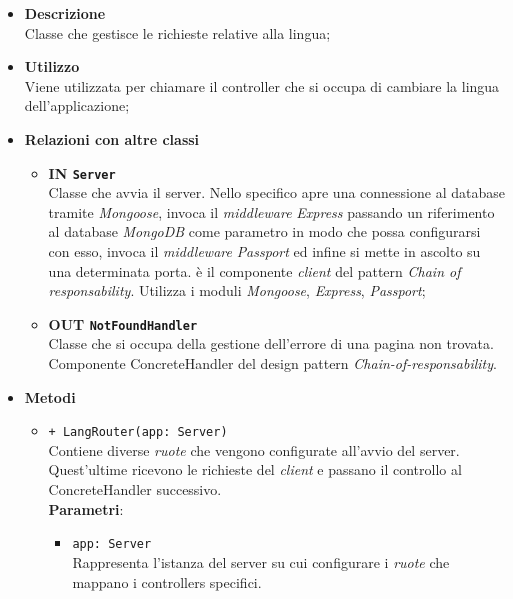 	\begin{itemize}
		\item \textbf{Descrizione} \\
		Classe che gestisce le richieste relative alla lingua;
		\item \textbf{Utilizzo} \\
		Viene utilizzata per chiamare il controller che si occupa di cambiare la lingua dell'applicazione;
		\item \textbf{Relazioni con altre classi}
			\begin{itemize}
				\item \textbf{IN \texttt{Server}} \\
				Classe che avvia il server. Nello specifico apre una connessione al database tramite \textit{Mongoose}, invoca il \textit{middleware} \textit{Express} passando un riferimento al database \textit{MongoDB} come parametro in modo che possa configurarsi con esso, invoca il \textit{middleware} \textit{Passport} ed infine si mette in ascolto su una determinata porta. è il componente \textit{client} del pattern \textit{Chain of responsability}. Utilizza i moduli \textit{Mongoose}, \textit{Express}, \textit{Passport};
				\item \textbf{OUT \texttt{NotFoundHandler}} \\
				Classe che si occupa della gestione dell'errore di una pagina non trovata. Componente ConcreteHandler del design pattern \textit{Chain-of-responsability}.
			\end{itemize}
		\item \textbf{Metodi}
			\begin{itemize}
				\item \texttt{+ LangRouter(app: Server)} \\
				Contiene diverse \textit{ruote} che vengono configurate all'avvio del server. Quest'ultime ricevono le richieste del \textit{client} e passano il controllo al ConcreteHandler successivo. \\
				\textbf{Parametri}:
					\begin{itemize}
						\item \texttt{app: Server} \\
						Rappresenta l'istanza del server su cui configurare i \textit{ruote} che mappano i controllers specifici.
					\end{itemize}
			\end{itemize}
	\end{itemize}